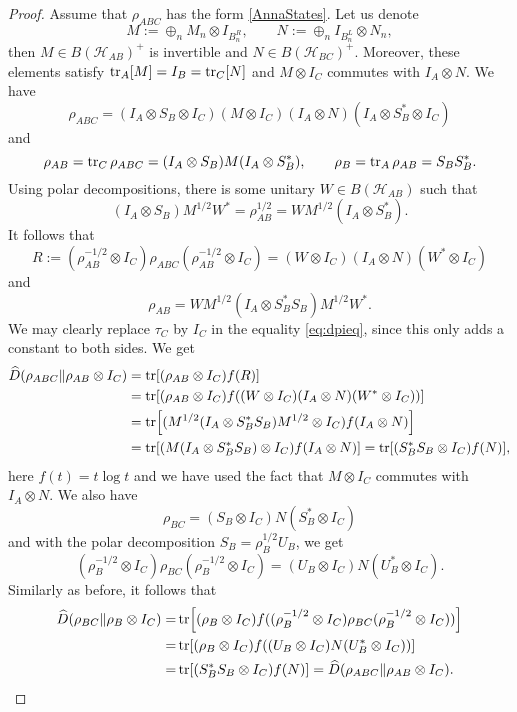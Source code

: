 \documentclass[11pt]{article}
\theoremstyle{newdefinition}
\theoremstyle{newplain}
\theoremstyle{myplain}
\DeclareMathOperator{\1}{\mathds{1}}
\begin{document}
{\begin{proof} Assume that $\rho_{ABC}$ has the form \eqref{AnnaStates}. Let us denote 
\[
M:= \oplus_n M_n\otimes I_{B^R_n}, \qquad N:=\oplus_n I_{B^L_n}\otimes N_n,
\]
then $M\in B(\mathcal{H}_{AB})^+$ is invertible and
$N\in B(\mathcal {H}_{BC})^+$. Moreover, these elements satisfy $\tr_A[M]=I_B=\tr_C[N]$ and $M\otimes
I_C$ commutes with $I_A\otimes N$. We have
\[
\rho_{ABC}=(I_A\otimes S_B\otimes I_C)(M\otimes I_C)(I_A\otimes N)(I_A\otimes
S_B^*\otimes I_C)
\]
and  
\[
\rho_{AB}=\tr_C \rho_{ABC}= (I_A\otimes S_B)M(I_A\otimes S_B^*),\qquad \rho_B=\tr_A
\rho_{AB}=S_BS_B^*.
\]
Using polar decompositions,  there is some unitary $W\in B(\mathcal {H}_{AB})$ such that 
\[
(I_A\otimes S_B)M^{1/2}W^*=\rho_{AB}^{1/2}=WM^{1/2}(I_A\otimes S_B^*).
\]
It follows that 
\[
R:=(\rho_{AB}^{-1/2}\otimes I_C)\rho_{ABC}(\rho_{AB}^{-1/2}\otimes I_C)=(W\otimes
I_C)(I_A\otimes N)(W^*\otimes I_C)
\]
and 
\[
\rho_{AB}=WM^{1/2}(I_A\otimes S_B^*S_B)M^{1/2}W^*.
\]
We may clearly replace $\tau_C$ by $I_C$ in the equality \eqref{eq:dpieq}, since this only
adds a constant to both sides. We get
\begin{align}
\widehat D(\rho_{ABC}\|\rho_{AB}\otimes I_C)&=\tr[(\rho_{AB}\otimes I_C)f(R)]\\
&=\tr [(\rho_{AB}\otimes I_C)f((W\otimes I_C)(I_A\otimes N)(W^*\otimes I_C))]\\
&=\tr [(M^{1/2}(I_A\otimes S_B^*S_B)M^{1/2}\otimes I_C) f(I_A\otimes N)]\\
&=\tr [(M(I_A\otimes S_B^*S_B)\otimes I_C)f(I_A\otimes N)]=\tr [(S_B^*S_B\otimes I_C) f(N)],
\end{align}
here $f(t)=t\log t$ and we have used the fact that $M\otimes I_C$ commutes with
$I_A\otimes N$. 
We also have
\[
\rho_{BC}=(S_B\otimes I_C)N(S_B^*\otimes I_C)
\]
and with the polar decomposition $S_B=\rho_B^{1/2}U_B$, we get 
\[
(\rho_B^{-1/2}\otimes I_C)\rho_{BC}(\rho_B^{-1/2}\otimes I_C)=(U_B\otimes
I_C)N(U_B^*\otimes I_C).
\]
Similarly as before, it follows that
\begin{align}
\widehat D(\rho_{BC}\|\rho_B\otimes I_C)=& \tr [(\rho_B\otimes I_C)f((\rho_B^{-1/2}\otimes
I_C)\rho_{BC}(\rho_B^{-1/2}\otimes I_C))]\\
=& \tr [(\rho_B\otimes I_C)f((U_B\otimes I_C)N(U_B^*\otimes I_C))]\\
=&\tr [(S_B^*S_B\otimes I_C)f(N)]=\widehat D(\rho_{ABC}\|\rho_{AB}\otimes I_C).
\end{align}



\end{proof}}
\end{document}
